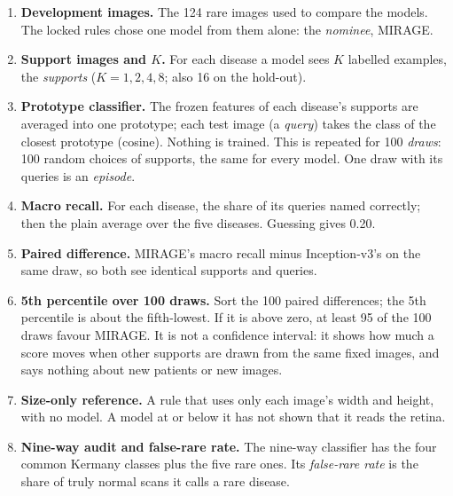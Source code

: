 \documentclass[10pt,a4paper]{article}
\begin{document}
\begin{enumerate}
  \item \textbf{Development images.} The 124 rare images used to compare the models. The locked rules chose
        one model from them alone: the \emph{nominee}, MIRAGE.
  \item \textbf{Support images and $K$.} For each disease a model sees $K$ labelled examples, the
        \emph{supports} ($K = 1, 2, 4, 8$; also 16 on the hold-out).
  \item \textbf{Prototype classifier.} The frozen features of each disease's supports are averaged into one
        prototype; each test image (a \emph{query}) takes the class of the closest prototype (cosine). Nothing is
        trained. This is repeated for 100 \emph{draws}: 100 random choices of supports, the same for every model.
        One draw with its queries is an \emph{episode}.
  \item \textbf{Macro recall.} For each disease, the share of its queries named correctly; then the plain
        average over the five diseases. Guessing gives 0.20.
  \item \textbf{Paired difference.} MIRAGE's macro recall minus Inception-v3's on the same draw, so both see
        identical supports and queries.
  \item \textbf{5th percentile over 100 draws.} Sort the 100 paired differences; the 5th percentile is about the
        fifth-lowest. If it is above zero, at least 95 of the 100 draws favour MIRAGE. It is not a confidence
        interval: it shows how much a score moves when other supports are drawn from the same fixed images, and
        says nothing about new patients or new images.
  \item \textbf{Size-only reference.} A rule that uses only each image's width and height, with no model. A
        model at or below it has not shown that it reads the retina.
  \item \textbf{Nine-way audit and false-rare rate.} The nine-way classifier has the four common Kermany classes
        plus the five rare ones. Its \emph{false-rare rate} is the share of truly normal scans it calls a rare
        disease.
\end{enumerate}
\end{document}
